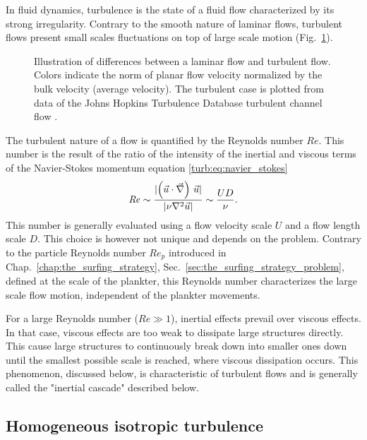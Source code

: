 In fluid dynamics, turbulence is the state of a fluid flow characterized by its strong irregularity.
Contrary to the smooth nature of laminar flows, turbulent flows present small scales fluctuations on top of large scale motion (Fig.~\ref{fig:laminar_turbulent_channels}).
\begin{figure}
	\centering
	\def\svgwidth{\textwidth}
	
  	\caption[Illustration of differences between a laminar flow and turbulent flow.]{
  		Illustration of differences between a laminar flow and turbulent flow.
  		Colors indicate the norm of planar flow velocity normalized by the bulk velocity (average velocity).
  		The turbulent case is plotted from data of the Johns Hopkins Turbulence Database turbulent channel flow \citep{li2008public, perlman2007data}.
  	}
  	\label{fig:laminar_turbulent_channels}
\end{figure}

The turbulent nature of a flow is quantified by the Reynolds number $\mathit{Re}$.
This number is the result of the ratio of the intensity of the inertial and viscous terms of the Navier-Stokes momentum equation \eqref{turb:eq:navier_stokes}
\begin{equation}\label{eq:reynolds_number}
	\mathit{Re} \sim \frac{\lvert\left( \vec{u} \cdot \vec{\nabla} \right) \, \vec{u}\rvert}{\lvert\nu \nabla^2 \vec{u}\rvert} \sim \frac{U D}{\nu}.
\end{equation}
This number is generally evaluated using a flow velocity scale $U$ and a flow length scale $D$.
This choice is however not unique and depends on the problem.
Contrary to the particle Reynolds number $\mathit{Re}_p$ introduced in Chap.~\ref{chap:the_surfing_strategy}, Sec.~\ref{sec:the_surfing_strategy_problem}, defined at the scale of the plankter, this Reynolds number characterizes the large scale flow motion, independent of the plankter movements.

For a large Reynolds number ($\mathit{Re} \gg 1$), inertial effects prevail over viscous effects.
In that case, viscous effects are too weak to dissipate large structures directly.
This cause large structures to continuously break down into smaller ones down until the smallest possible scale is reached, where viscous dissipation occurs.
This phenomenon, discussed below, is characteristic of turbulent flows and is generally called the "inertial cascade" described below.

\subsection{Homogeneous isotropic turbulence}\label{sec:numeric_hit}

